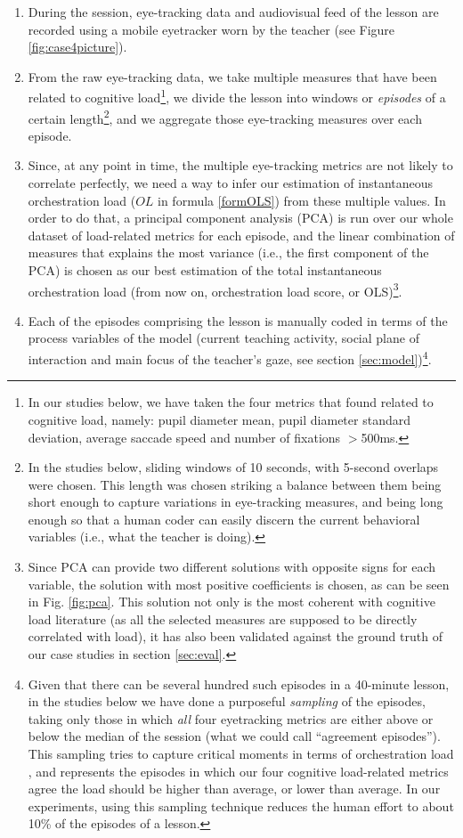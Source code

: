 \documentclass[10pt,journal,compsoc]{IEEEtran}
\begin{document}
\begin{enumerate}
\item During the session, eye-tracking data and audiovisual feed of the lesson are recorded using a mobile eyetracker worn by the teacher (see Figure \ref{fig:case4picture}).
\item From the raw eye-tracking data, we take multiple measures that have been related to cognitive load\footnote{In our studies below, we have taken the four metrics that \cite{Buettner2013} found related to cognitive load, namely: pupil diameter mean, pupil diameter standard deviation, average saccade speed and number of fixations $>$500ms.}, we divide the lesson into windows or \textit{episodes} of a certain length\footnote{In the studies below, sliding windows of 10 seconds, with 5-second overlaps were chosen. This length was chosen striking a balance between them being short enough to capture variations in eye-tracking measures, and being long enough so that a human coder can easily discern the current behavioral variables (i.e., what the teacher is doing).}, and we aggregate those eye-tracking measures over each episode.
\item Since, at any point in time, the multiple eye-tracking metrics are not likely to correlate perfectly, we need a way to infer our estimation of instantaneous orchestration load ($OL$ in formula \ref{formOLS}) from these multiple values. In order to do that, a principal component analysis (PCA) is run over our whole dataset of load-related metrics for each episode, and the linear combination of measures that explains the most variance (i.e., the first component of the PCA) is chosen as our best estimation of the total instantaneous orchestration load (from now on, orchestration load score, or OLS)\footnote{Since PCA can provide two different solutions with opposite signs for each variable, the solution with most positive coefficients is chosen, as can be seen in Fig. \ref{fig:pca}. This solution not only is the most coherent with cognitive load literature (as all the selected measures are supposed to be directly correlated with load), it has also been validated against the ground truth of our case studies in section \ref{sec:eval}.}.
\item Each of the episodes comprising the lesson is manually coded in terms of the process variables of the model (current teaching activity, social plane of interaction and main focus of the teacher's gaze, see section \ref{sec:model})\footnote{Given that there can be several hundred such episodes in a 40-minute lesson, in the studies below we have done a purposeful \textit{sampling} of the episodes, taking only those in which \textit{all} four eyetracking metrics are either above or below the median of the session (what we could call ``agreement episodes''). This sampling tries to capture critical moments in terms of orchestration load \cite{Prieto2014}, and represents the episodes in which our four cognitive load-related metrics agree the load should be higher than average, or lower than average. In our experiments, using this sampling technique reduces the human effort to about 10\% of the episodes of a lesson.}.

\end{enumerate}
\end{document}
